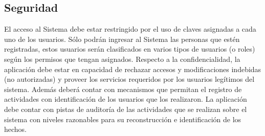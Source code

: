 \subsection{Seguridad}
El acceso al Sistema debe estar restringido por el uso de claves asignadas a cada uno de los usuarios. S\'olo podr\'an ingresar al Sistema las personas que est\'en registradas, estos usuarios ser\'an clasificados en varios tipos de usuarios (o roles) seg\'un los permisos que tengan asignados.
Respecto a la confidencialidad, la aplicaci\'on debe estar en capacidad de rechazar accesos y modificaciones indebidas (no autorizadas) y proveer los servicios requeridos por los usuarios leg\'itimos del sistema. Adem\'as deber\'a contar con mecanismos que permitan el registro de actividades con identificaci\'on de los usuarios que los realizaron.
La aplicaci\'on debe contar con pistas de auditor\'ia de las actividades que se realizan sobre el sistema con niveles razonables para su reconstrucci\'on e identificaci\'on de los hechos.
